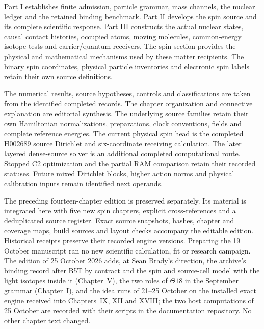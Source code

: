 Part I establishes finite admission, particle grammar, mass channels, the nuclear ledger and the retained binding benchmark. Part II develops the spin source and its complete scientific response. Part III constructs the actual nuclear states, causal contact histories, occupied atoms, moving molecules, common-energy isotope tests and carrier/quantum receivers. The spin section provides the physical and mathematical mechanisms used by these matter recipients. The binary spin coordinates, physical particle inventories and electronic spin labels retain their own source definitions.

The numerical results, source hypotheses, controls and classifications are taken from the identified completed records. The chapter organization and connective explanation are editorial synthesis. The underlying source families retain their own Hamiltonian normalizations, preparations, clock conventions, fields and complete reference energies. The current physical spin head is the completed H002689 source Dirichlet and six-coordinate receiving calculation. The later layered dense-source solver is an additional completed computational route. Stopped C2 optimization and the partial RAM comparison retain their recorded statuses. Future mixed Dirichlet blocks, higher action norms and physical calibration inputs remain identified next operands.

The preceding fourteen-chapter edition is preserved separately. Its material is integrated here with five new spin chapters, explicit cross-references and a deduplicated source register. Exact source snapshots, hashes, chapter and coverage maps, build sources and layout checks accompany the editable edition. Historical receipts preserve their recorded engine versions. Preparing the 19 October manuscript ran no new scientific calculation, fit or research campaign. The edition of 25 October 2026 adds, at Sean Brady's direction, the archive's binding record after B5T by contract and the spin and source-cell model with the light isotopes inside it (Chapter~V), the two roles of $\Theta18$ in the September grammar (Chapter~I), and the idea runs of 21--25 October on the installed exact engine received into Chapters~IX, XII and XVIII; the two host computations of 25 October are recorded with their scripts in the documentation repository. No other chapter text changed.



















\clearpage\onecolumn{}


